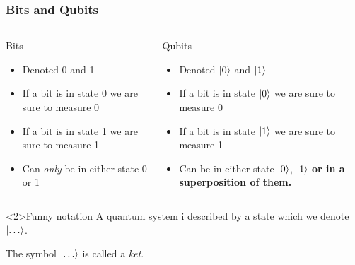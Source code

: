 \documentclass[10pt]{beamer}
\begin{document}
\begin{frame}
  \frametitle{Bits and Qubits}
  \begin{columns}
    \begin{column}{0.5\linewidth}
      \begin{block}{Bits}
        \begin{itemize}
        \item Denoted 0 and 1
        \item If a bit is in state 0 we are sure to measure 0
        \item If a bit is in state 1 we are sure to measure 1
        \item Can \emph{only} be in either state 0 or 1
        \end{itemize}
      \end{block}
    \end{column}
    \begin{column}{0.5\linewidth}
      \begin{block}{Qubits}
        \begin{itemize}
        \item Denoted $\ket{0}$ and $\ket{1}$
        \item If a bit is in state $\ket{0}$ we are sure to measure 0
        \item If a bit is in state $\ket{1}$ we are sure to measure 1
        \item Can be in either state $\ket{0}$, $\ket{1}$ \textbf{or in a superposition of them.}
        \end{itemize}
      \end{block}
    \end{column}
  \end{columns}
  
  \begin{block}<2>{Funny notation}
    A quantum system i described by a state which we denote $\ket{\dots}$.

    The symbol $\ket{\dots}$ is called a \emph{ket}.
  \end{block}
\end{frame}
\end{document}
